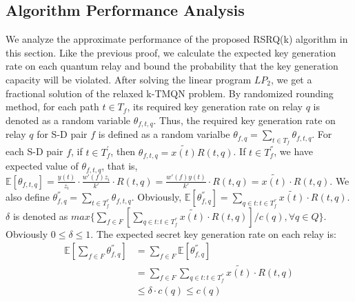 {	
\subsection{Algorithm Performance Analysis}
We analyze the approximate performance of the proposed RSRQ(k) algorithm in this section. Like the previous proof, we calculate the expected key generation rate on each quantum relay and bound the probability that the key generation capacity will be violated. After solving the linear program $LP_2$, we get a fractional solution of the relaxed k-TMQN problem. By randomized rounding method, for each path $t \in T_f$, its required key generation rate on relay $q$ is denoted as a random variable $\theta_{f,t,q}$. Thus, the required key generation rate on relay $q$ for S-D pair $f$ is defined as a random varialbe $\theta_{f,q} = \sum_{t \in T_f}\theta_{f,t,q}$.
For each S-D pair $f$, if $t \in T^{'}_f$, then $\theta_{f,t,q} = \widetilde{x(t)}R(t,q)$. If $t \in T^{''}_f$, we have expected value of $\theta_{f,t,q}$, that is, $\mathbb{E}[\theta_{f,t,q}]= \frac{y(t)}{z_i} \cdot \frac{w'(f)z_i}{k'} \cdot R(t,q) = \frac{w'(f)y(t)}{k'} \cdot R(t,q) = \widetilde{x(t)} \cdot R(t,q)$. We also define $\theta^{''}_{f,q} = \sum_{t \in T^{''}_f}\theta_{f,t,q}$. Obviously, $\mathbb{E}[\theta^{''}_{f,q}]= \sum_{q \in t:t \in T^{''}_f}\widetilde{x(t)} \cdot R(t,q)$. $\delta$ is denoted as $max\{\sum_{f \in F}[\sum_{q \in t:t \in T^{''}_f}\widetilde{x(t)}\cdot R(t,q)]/c(q), \forall q \in Q\}$. Obviously $0 \le \delta \le 1$. The expected secret key generation rate on each relay is:
\begin{equation}
\begin{aligned}
	\mathbb{E}[\sum_{f \in F}\theta^{''}_{f,q}] &=  \sum_{f \in F} \mathbb{E}[\theta^{''}_{f,q}] \\
	&= \sum_{f \in F}\sum_{q \in t:t \in T^{''}_f}\widetilde{x(t)}\cdot R(t,q) \\
	& \le \delta \cdot c(q) \le c(q)
\end{aligned}
\end{equation} 

}

